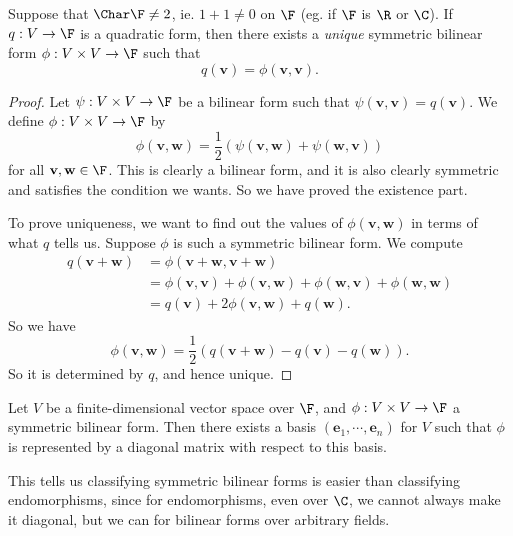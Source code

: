 \documentclass[a4paper]{article}
\begin{document}
\begin{prop}
  Suppose that $\Char \F \not= 2$, ie. $1 + 1 \not= 0$ on $\F$ (eg. if $\F$ is $\R$ or $\C$). If $q: V\to \F$ is a quadratic form, then there exists a \emph{unique} symmetric bilinear form $\phi: V \times V\to \F$ such that
  \[
    q(\mathbf{v}) = \phi(\mathbf{v}, \mathbf{v}).
  \]
\end{prop}

\begin{proof}
  Let $\psi: V \times V\to \F$ be a bilinear form such that $\psi(\mathbf{v}, \mathbf{v}) = q(\mathbf{v})$. We define $\phi: V \times V\to \F$ by
  \[
    \phi(\mathbf{v}, \mathbf{w}) = \frac{1}{2}(\psi(\mathbf{v}, \mathbf{w}) + \psi(\mathbf{w}, \mathbf{v}))
  \]
  for all $\mathbf{v}, \mathbf{w} \in \F$. This is clearly a bilinear form, and it is also clearly symmetric and satisfies the condition we wants. So we have proved the existence part.

  To prove uniqueness, we want to find out the values of $\phi(\mathbf{v}, \mathbf{w})$ in terms of what $q$ tells us. Suppose $\phi$ is such a symmetric bilinear form. We compute
  \begin{align*}
    q(\mathbf{v} + \mathbf{w}) &= \phi(\mathbf{v} + \mathbf{w}, \mathbf{v} + \mathbf{w}) \\
    &= \phi(\mathbf{v}, \mathbf{v}) + \phi(\mathbf{v}, \mathbf{w}) + \phi(\mathbf{w}, \mathbf{v}) + \phi(\mathbf{w}, \mathbf{w})\\
    &= q(\mathbf{v}) + 2\phi(\mathbf{v}, \mathbf{w}) + q(\mathbf{w}).
  \end{align*}
  So we have
  \[
    \phi(\mathbf{v}, \mathbf{w}) = \frac{1}{2}(q(\mathbf{v} + \mathbf{w}) - q(\mathbf{v}) - q(\mathbf{w})).
  \]
  So it is determined by $q$, and hence unique.
\end{proof}

\begin{thm}
  Let $V$ be a finite-dimensional vector space over $\F$, and $\phi: V\times V \to \F$ a symmetric bilinear form. Then there exists a basis $(\mathbf{e}_1, \cdots, \mathbf{e}_n)$ for $V$ such that $\phi$ is represented by a diagonal matrix with respect to this basis.
\end{thm}
This tells us classifying symmetric bilinear forms is easier than classifying endomorphisms, since for endomorphisms, even over $\C$, we cannot always make it diagonal, but we can for bilinear forms over arbitrary fields.
\end{document}
